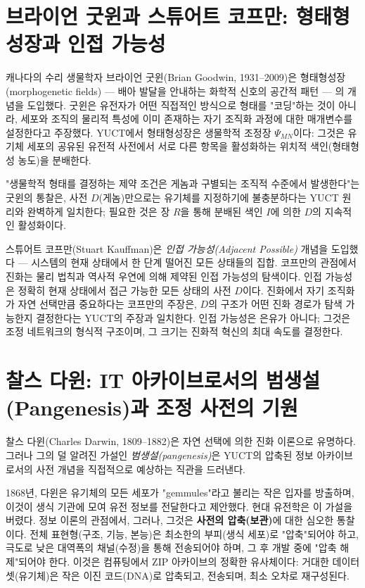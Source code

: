 \documentclass[12pt,a4paper]{article}
\begin{document}
	\section{브라이언 굿윈과 스튜어트 코프만: 형태형성장과 인접 가능성}
	
	캐나다의 수리 생물학자 브라이언 굿윈(Brian Goodwin, 1931–2009)은 형태형성장(morphogenetic fields) — 배아 발달을 안내하는 화학적 신호의 공간적 패턴 — 의 개념을 도입했다. 굿윈은 유전자가 어떤 직접적인 방식으로 형태를 "코딩"하는 것이 아니라, 세포와 조직의 물리적 특성에 이미 존재하는 자기 조직화 과정에 대한 매개변수를 설정한다고 주장했다. YUCT에서 형태형성장은 생물학적 조정장 \(\Psi_{MN}\)이다: 그것은 유기체 세포의 공유된 유전적 사전에서 서로 다른 항목을 활성화하는 위치적 색인(형태형성 농도)을 분배한다.
	
	"생물학적 형태를 결정하는 제약 조건은 게놈과 구별되는 조직적 수준에서 발생한다"는 굿윈의 통찰은, 사전 \(D\)(게놈)만으로는 유기체를 지정하기에 불충분하다는 YUCT 원리와 완벽하게 일치한다; 필요한 것은 장 \(R\)을 통해 분배된 색인 \(I\)에 의한 \(D\)의 지속적인 활성화이다.
	
	스튜어트 코프만(Stuart Kauffman)은 \emph{인접 가능성(Adjacent Possible)} 개념을 도입했다 — 시스템의 현재 상태에서 한 단계 떨어진 모든 상태들의 집합. 코프만의 관점에서 진화는 물리 법칙과 역사적 우연에 의해 제약된 인접 가능성의 탐색이다. 인접 가능성은 정확히 현재 상태에서 접근 가능한 모든 상태의 사전 \(D\)이다. 진화에서 자기 조직화가 자연 선택만큼 중요하다는 코프만의 주장은, \(D\)의 구조가 어떤 진화 경로가 탐색 가능한지 결정한다는 YUCT의 주장과 일치한다. 인접 가능성은 은유가 아니다; 그것은 조정 네트워크의 형식적 구조이며, 그 크기는 진화적 혁신의 최대 속도를 결정한다.
	
	\section{찰스 다윈: IT 아카이브로서의 범생설(Pangenesis)과 조정 사전의 기원}
	
	찰스 다윈(Charles Darwin, 1809–1882)은 자연 선택에 의한 진화 이론으로 유명하다. 그러나 그의 덜 알려진 가설인 \emph{범생설(pangenesis)}은 YUCT의 압축된 정보 아카이브로서의 사전 개념을 직접적으로 예상하는 직관을 드러낸다.
	
	1868년, 다윈은 유기체의 모든 세포가 "gemmules"라고 불리는 작은 입자를 방출하며, 이것이 생식 기관에 모여 유전 정보를 전달한다고 제안했다. 현대 유전학은 이 가설을 버렸다. 정보 이론의 관점에서, 그러나, 그것은 \textbf{사전의 압축(보관)}에 대한 심오한 통찰이다. 전체 표현형(구조, 기능, 본능)은 최소한의 부피(생식 세포)로 "압축"되어야 하고, 극도로 낮은 대역폭의 채널(수정)을 통해 전송되어야 하며, 그 후 개발 중에 "압축 해제"되어야 한다. 이것은 컴퓨팅에서 ZIP 아카이브의 정확한 유사체이다: 거대한 데이터셋(유기체)은 작은 이진 코드(DNA)로 압축되고, 전송되며, 최소 오차로 재구성된다.
	
\end{document}
